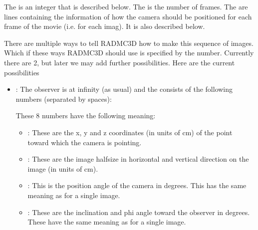 \documentclass[letterpaper,10pt,english]{sphinxmanual}
\begin{document}
The  is an integer that is described below.  The  is the
number of frames. The  are lines
containing the information of how the camera should be positioned for each frame
of the movie (i.e. for each imag). It is also described below.

There are multiple ways to tell RADMC\sphinxhyphen{}3D how to make
this sequence of images. Which if these ways RADMC\sphinxhyphen{}3D should use is specified
by the  number. Currently there are 2, but later we may add
further possibilities. Here are the current possibilities
\begin{itemize}
\item {} 
:
The observer is at infinity (as usual) and the  consists of the following numbers (separated by
spaces):

\begin{sphinxVerbatim}[commandchars=\\\{\}]
       
\end{sphinxVerbatim}

These 8 numbers have the following meaning:
\begin{itemize}
\item {} 
:
These are the x, y and z coordinates (in units of cm) of the point toward
which the camera is pointing.

\item {} 
:
These are the image half\sphinxhyphen{}size in horizontal and vertical direction on the
image (in units of cm).

\item {} 
:
This is the position angle of the camera in degrees.
This has the same meaning as for a single image.

\item {} 
:
These are the inclination and phi angle toward the observer in degrees.
These have the same meaning as for a single image.

\end{itemize}


\end{itemize}
\end{document}
